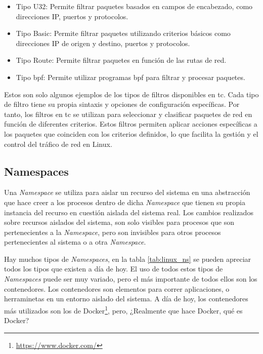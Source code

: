 \begin{itemize}
    \item Tipo U32: Permite filtrar paquetes basados en campos de encabezado, como direcciones IP, puertos y protocolos.
    \item Tipo Basic: Permite filtrar paquetes utilizando criterios básicos como direcciones IP de origen y destino, puertos y protocolos.
    \item Tipo Route: Permite filtrar paquetes en función de las rutas de red.
    \item Tipo \gls{bpf}: Permite utilizar programas \gls{bpf} para filtrar y procesar paquetes.
\end{itemize}

Estos son solo algunos ejemplos de los tipos de filtros disponibles en \gls{tc}. Cada tipo de filtro tiene su propia sintaxis y opciones de configuración específicas. Por tanto, los filtros en \gls{tc} se utilizan para seleccionar y clasificar paquetes de red en función de diferentes criterios. Estos filtros permiten aplicar acciones específicas a los paquetes que coinciden con los criterios definidos, lo que facilita la gestión y el control del tráfico de red en Linux.



\subsection{Namespaces}
\label{namespaces}
Una \textit{Namespace} se utiliza para aislar un recurso del sistema en una abstracción que hace  creer a los procesos dentro de dicha \textit{Namespace} que tienen su propia instancia del recurso en cuestión aislada del sistema real.  Los cambios realizados sobre recursos aislados del sistema, son solo visibles para procesos que son pertenecientes a la \textit{Namespace}, pero son invisibles para otros procesos pertenecientes al sistema o a otra \textit{Namespace}.\\
\par
Hay muchos tipos de \textit{Namespaces}, en la tabla \ref{tab:linux_ns} se pueden apreciar todos los tipos que existen a día de hoy. El uso de todos estos tipos de \textit{Namespaces} puede ser muy variado, pero el más importante de todos ellos son los contenedores. Los contenedores son elementos para correr aplicaciones, o herraminetas en un entorno aislado del sistema. A día de hoy, los contenedores más utilizados son los de Docker\footnote{\url{https://www.docker.com/}}, pero, ¿Realmente que hace Docker, qué es Docker?\\
\par

